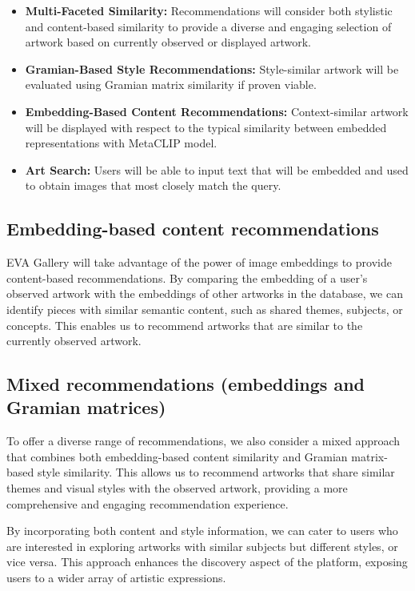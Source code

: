 \begin{itemize}
    \item \textbf{Multi-Faceted Similarity:} Recommendations will consider both stylistic and content-based similarity to provide a diverse and engaging selection of artwork based on currently observed or displayed artwork.
    \item \textbf{Gramian-Based Style Recommendations:} Style-similar artwork will be evaluated using Gramian matrix similarity if proven viable.
    \item \textbf{Embedding-Based Content Recommendations:} Context-similar artwork will be displayed with respect to the typical similarity between embedded representations with MetaCLIP model.
    \item \textbf{Art Search:} Users will be able to input text that will be embedded and used to obtain images that most closely match the query.
\end{itemize}

\subsection{Embedding-based content recommendations}
EVA Gallery will take advantage of the power of image embeddings to provide content-based recommendations. By comparing the embedding of a user's observed artwork with the embeddings of other artworks in the database, we can identify pieces with similar semantic content, such as shared themes, subjects, or concepts. This enables us to recommend artworks that are similar to the currently observed artwork.

\subsection{Mixed recommendations (embeddings and Gramian matrices)}
To offer a diverse range of recommendations, we also consider a mixed approach that combines both embedding-based content similarity and Gramian matrix-based style similarity. This allows us to recommend artworks that share similar themes and visual styles with the observed artwork, providing a more comprehensive and engaging recommendation experience.

By incorporating both content and style information, we can cater to users who are interested in exploring artworks with similar subjects but different styles, or vice versa. This approach enhances the discovery aspect of the platform, exposing users to a wider array of artistic expressions.

